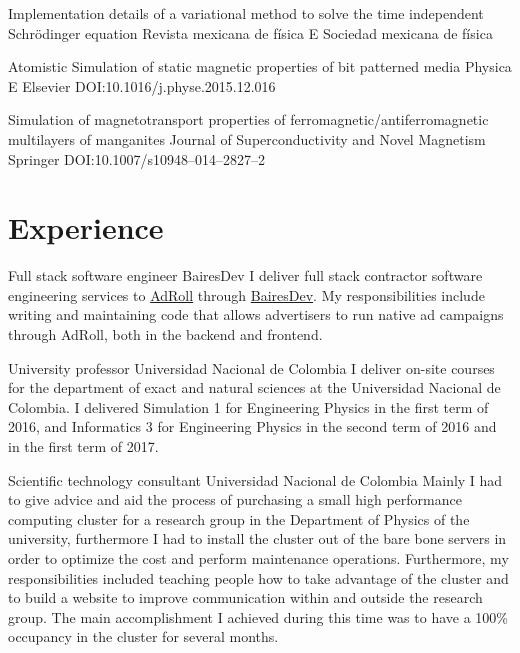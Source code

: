 \documentclass[12pt,english]{moderncv}
\begin{document}
        {%
            Implementation details of a variational method to solve the time
            independent Schrödinger equation%
        }
        {Revista mexicana de física E}
        {Sociedad mexicana de física}
        {}
        {}

        {Atomistic Simulation of static magnetic properties of bit patterned media}
        {Physica E}
        {Elsevier}
        {}
        {DOI:\@ 10.1016/j.physe.2015.12.016}

        {%
            Simulation of magnetotransport properties of
            ferromagnetic/antiferromagnetic multilayers of manganites%
        }
        {Journal of Superconductivity and Novel Magnetism}
        {Springer}
        {}
        {DOI:\@ 10.1007/s10948--014--2827--2}


\section{Experience}

        {Full stack software engineer}
        {BairesDev}
        {}
        {}
        {%
            I deliver full stack contractor software engineering services to
            \href{https://www.adroll.com/}{AdRoll} through
            \href{http://www.bairesdev.com/}{BairesDev}. My responsibilities
            include writing and maintaining code that allows advertisers to run
            native ad campaigns through AdRoll, both in the backend and
            frontend.
        }

        {University professor}
        {Universidad Nacional de Colombia}
        {}
        {}
        {%
            I deliver on-site courses for the department of exact and natural
            sciences at the Universidad Nacional de Colombia. I delivered
            Simulation 1 for Engineering Physics in the first term of 2016, and
            Informatics 3 for Engineering Physics in the second term of 2016
            and in the first term of 2017.
        }

        {Scientific technology consultant}
        {Universidad Nacional de Colombia}
        {}
        {}
        {%
            Mainly I had to give advice and aid the process of purchasing a
            small high performance computing cluster for a research group in
            the Department of Physics of the university, furthermore I had to
            install the cluster out of the bare bone servers in order to
            optimize the cost and perform maintenance operations. Furthermore,
            my responsibilities included teaching people how to take advantage
            of the cluster and to build a website to improve communication
            within and outside the research group. The main accomplishment I
            achieved during this time was to have a 100\% occupancy in the
            cluster for several months.
        }
\end{document}
